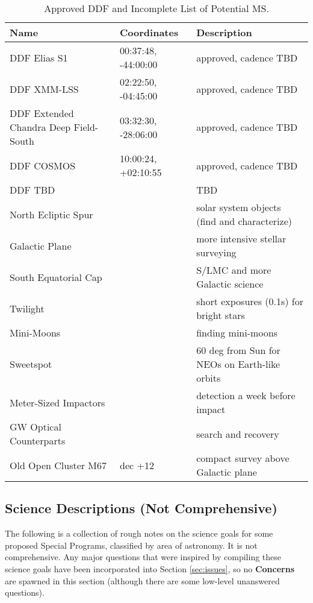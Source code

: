 \documentclass[DM,lsstdraft,toc]{lsstdoc}
\begin{document}
\begin{table}[h]
\begin{center}
\begin{footnotesize}
\caption{Approved DDF and Incomplete List of Potential MS.}
\label{tab:ddfms}
\begin{tabular}{lll}
\hline \hline
Name & Coordinates & Description  \\
\hline
DDF Elias S1    & 00:37:48, -44:00:00  & approved, cadence TBD \\
DDF XMM-LSS & 02:22:50, -04:45:00  & approved, cadence TBD  \\
DDF Extended Chandra Deep Field-South & 03:32:30, -28:06:00  & approved, cadence TBD  \\
DDF COSMOS  & 10:00:24, +02:10:55 & approved, cadence TBD  \\
DDF TBD  & & TBD \\
North Ecliptic Spur      & & solar system objects (find and characterize) \\
Galactic Plane             & & more intensive stellar surveying \\
South Equatorial Cap  & & S/LMC and more Galactic science \\
Twilight                        & & short exposures (0.1s) for bright stars \\
Mini-Moons                     &  & finding mini-moons \\
Sweetspot                       & & 60 deg from Sun for NEOs on Earth-like orbits \\
Meter-Sized Impactors     & & detection a week before impact \\
GW Optical Counterparts & & search and recovery \\
Old Open Cluster M67      & dec +12 & compact survey above Galactic plane  \\
\hline
\end{tabular}
\end{footnotesize}
\end{center}
\end{table}

\subsection{Science Descriptions (Not Comprehensive)}\label{ssec:science_descriptions}

The following is a collection of rough notes on the science goals for some proposed Special Programs, classified by area of astronomy. It is not comprehensive. Any major questions that were inspired by compiling these science goals have been incorporated into Section \ref{sec:issues}, so no \textbf{Concerns} are spawned in this section (although there are some low-level unanswered questions).
\end{document}
